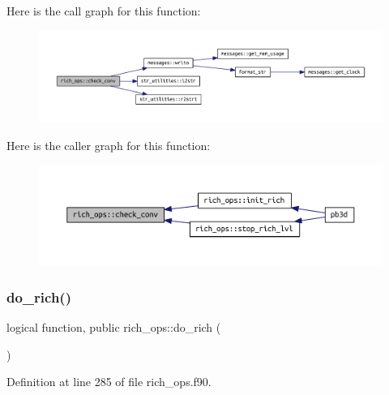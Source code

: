 Here is the call graph for this function\+:
\nopagebreak
\begin{figure}[H]
\begin{center}
\leavevmode
\includegraphics[width=350pt]{namespacerich__ops_ac00cce686d45540b238b3b6e39c9bdeb_cgraph}
\end{center}
\end{figure}
Here is the caller graph for this function\+:
\nopagebreak
\begin{figure}[H]
\begin{center}
\leavevmode
\includegraphics[width=350pt]{namespacerich__ops_ac00cce686d45540b238b3b6e39c9bdeb_icgraph}
\end{center}
\end{figure}
\mbox{\label{namespacerich__ops_a50f4088b9ddd59597987fb4112f2a73e}} 
\subsubsection{\texorpdfstring{do\+\_\+rich()}{do\_rich()}}
{\footnotesize\ttfamily logical function, public rich\+\_\+ops\+::do\+\_\+rich (\begin{DoxyParamCaption}{ }\end{DoxyParamCaption})}



Definition at line 285 of file rich\+\_\+ops.\+f90.

